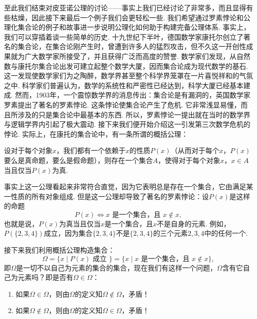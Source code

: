 至此我们结束对皮亚诺公理的讨论——事实上我们已经讨论了非常多，而且显得有些枯燥，因此接下来最后一个例子我们会更轻松一些. 我们希望通过罗素悖论和公理化集合论的例子和故事进一步说明公理化如何助于构建完备公理体系. 事实上，我们可以穿插着谈一些简单的历史. 十九世纪下半叶，德国数学家康托尔创立了著名的集合论，在集合论刚产生时，曾遭到许多人的猛烈攻击，但不久这一开创性成果就为广大数学家所接受了，并且获得广泛而高度的赞誉. 数学家们发现，从自然数与康托尔集合论出发可建立起整个数学大厦，因而集合论成为现代数学的基石. 这一发现使数学家们为之陶醉，数学界甚至整个科学界笼罩在一片喜悦祥和的气氛之中. 科学家们普遍认为，数学的系统性和严密性已经达到，科学大厦已经基本建成. 然而，1903年，一个震惊数学界的消息传出：集合论是有漏洞的，英国数学家罗素提出了著名的罗素悖论. 这条悖论使集合论产生了危机. 它非常浅显易懂，而且所涉及的只是集合论中最基本的东西. 所以，罗素悖论一提出就在当时的数学界与逻辑学界内引起了极大震动. 接下来我们便开始介绍这一引发第三次数学危机的悖论. 实际上，在康托的集合论中，有一条所谓的概括公理：

\begin{axiom}%
    设对于每个对象$x$，我们都有一个依赖于$x$的性质$P(x)$（从而对于每个$x$，$P(x)$要么是真命题，要么是假命题），则存在一个集合$A$，使得对于每个对象$x$，$x\in A$当且仅当$P(x)$为真.
\end{axiom}

事实上这一公理看起来非常符合直觉，因为它表明总是存在一个集合，它由满足某一性质的所有对象组成. 但是这一公理却导致了著名的罗素悖论：设$P(x)$是这样的命题
\[P(x)\iff x\text{~是一个集合，且~}x\notin x,\]
也就是说，$P(x)$为真当且仅当$x$是一个集合，且$x$不是自身的元素. 例如，$P(\{2,3,4\})$成立，因为集合$\{2,3,4\}$不是$\{2,3,4\}$的三个元素$2,3,4$中的任何一个.

接下来我们利用概括公理构造集合：
\[\Omega=\{x\mid P(x)\text{~成立~}\}=\{x\mid x\text{~是一个集合，且~}x\notin x\},\]
即$\Omega$是一切不以自己为元素的集合的集合，现在我们有这样一个问题，$\Omega$含有它自己为元素吗？即是否有$\Omega\in\Omega$：
\begin{enumerate}
    \item 如果$\Omega\in \Omega$，则由$\Omega$的定义知$\Omega\notin \Omega$，矛盾！

    \item 如果$\Omega\notin \Omega$，则由$\Omega$的定义知$\Omega\in \Omega$，矛盾！
\end{enumerate}

